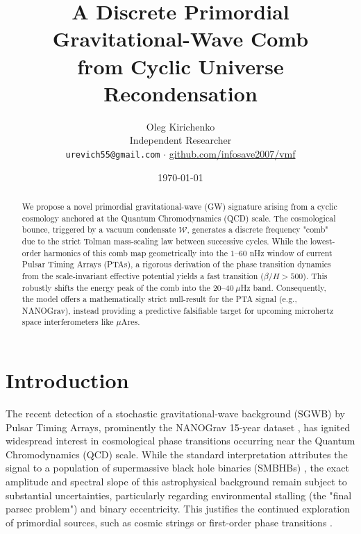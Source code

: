 \documentclass[12pt,a4paper]{article}
\begin{document}
\title{\textbf{A Discrete Primordial Gravitational-Wave Comb \\ from Cyclic Universe Recondensation}}
\author{Oleg Kirichenko\\[0.5em]
\small Independent Researcher \\
\small \texttt{urevich55@gmail.com} $\cdot$ \url{github.com/infosave2007/vmf}}
\date{\today}

\maketitle

\begin{abstract}
We propose a novel primordial gravitational-wave (GW) signature arising from a cyclic cosmology anchored at the Quantum Chromodynamics (QCD) scale. The cosmological bounce, triggered by a vacuum condensate $\mathcal{W}$, generates a discrete frequency "comb" due to the strict Tolman mass-scaling law between successive cycles. While the lowest-order harmonics of this comb map geometrically into the $1\text{--}60$ nHz window of current Pulsar Timing Arrays (PTAs), a rigorous derivation of the phase transition dynamics from the scale-invariant effective potential yields a fast transition ($\beta/H > 500$). This robustly shifts the energy peak of the comb into the $20\text{--}40~\mu$Hz band. Consequently, the model offers a mathematically strict null-result for the PTA signal (e.g., NANOGrav), instead providing a predictive falsifiable target for upcoming microhertz space interferometers like $\mu$Ares.
\end{abstract}

\vspace{1em}

\section{Introduction}
The recent detection of a stochastic gravitational-wave background (SGWB) by Pulsar Timing Arrays, prominently the NANOGrav 15-year dataset \cite{nanograv2023}, has ignited widespread interest in cosmological phase transitions occurring near the Quantum Chromodynamics (QCD) scale. While the standard interpretation attributes the signal to a population of supermassive black hole binaries (SMBHBs) \cite{antoniadis2023}, the exact amplitude and spectral slope of this astrophysical background remain subject to substantial uncertainties, particularly regarding environmental stalling (the "final parsec problem") and binary eccentricity. This justifies the continued exploration of primordial sources, such as cosmic strings or first-order phase transitions \cite{caprini2016, caprini2020}.
\end{document}
